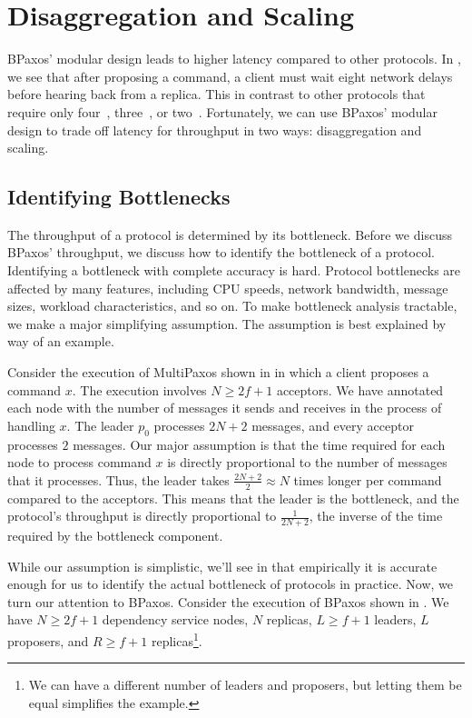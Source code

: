 \section{Disaggregation and Scaling}
BPaxos' modular design leads to higher latency compared to other protocols. In
, we see that after proposing a command, a client must
wait eight network delays before hearing back from a replica. This in contrast
to other protocols that require only four~\cite{ongaro2014search,
lamport2001paxos, moraru2013there, arun2017speeding},
three~\cite{lamport2005generalized, lamport2006fast}, or two~\cite{li2016just,
park2019exploiting}. Fortunately, we can use BPaxos' modular design to trade
off latency for throughput in two ways: disaggregation and scaling.

\subsection{Identifying Bottlenecks}
The throughput of a protocol is determined by its bottleneck. Before we discuss
BPaxos' throughput, we discuss how to identify the bottleneck of a protocol.
Identifying a bottleneck with complete accuracy is hard. Protocol bottlenecks
are affected by many features, including CPU speeds, network bandwidth, message
sizes, workload characteristics, and so on. To make bottleneck analysis
tractable, we make a major simplifying assumption. The assumption is best
explained by way of an example.

{}

Consider the execution of MultiPaxos shown in  in
which a client proposes a command $x$. The execution involves $N \geq 2f+1$
acceptors. We have annotated each node with the number of messages it sends and
receives in the process of handling $x$. The leader $p_0$ processes $2N+2$
messages, and every acceptor processes $2$ messages. Our major assumption is
that the time required for each node to process command $x$ is directly
proportional to the number of messages that it processes. Thus, the leader
takes $\frac{2N+2}{2} \approx N$ times longer per command compared to the
acceptors. This means that the leader is the bottleneck, and the protocol's
throughput is directly proportional to $\frac{1}{2N+2}$, the inverse of the
time required by the bottleneck component.

While our assumption is simplistic, we'll see in  that
empirically it is accurate enough for us to identify the actual bottleneck of
protocols in practice. Now, we turn our attention to BPaxos. Consider the
execution of BPaxos shown in . We have $N \geq 2f+1$
dependency service nodes, $N$ replicas, $L \geq f+1$ leaders, $L$ proposers,
and $R \geq f+1$ replicas\footnote{We can have a different number of leaders
and proposers, but letting them be equal simplifies the example.}.

